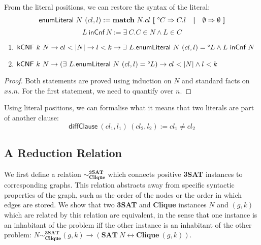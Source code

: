 \documentclass[a4paper,UKenglish,cleveref, autoref]{lipics-v2019}
\begin{document}
From the literal positions, we can restore the syntax of the literal:
\begin{align*}
  \textsf{enumLiteral}~N~(cl, l) := \textbf{match}~ N.cl ~\textbf{[}~ \degree C \Rightarrow C.l \quad\textbf{|}\quad \emptyset \Rightarrow \emptyset ~\textbf{]} 
\end{align*}
\[L~\textsf{inCnf}~N := \exists~C. C \in N \land L \in C \]
\begin{proposition}\label{prop:enumLiteralcorrect}\leavevmode
  \begin{enumerate}
    \item $\normalfont\textsf{kCNF}~k~N \rightarrow cl < |N| \rightarrow l < k \rightarrow \exists~L. \normalfont\textsf{enumLiteral}~N~(cl, l) = \degree L \land L~\textsf{inCnf}~N $
    \item $\normalfont\textsf{kCNF}~k~N \rightarrow (\exists~L. \normalfont\textsf{enumLiteral}~N~(cl, l) = \degree L) \rightarrow cl < |N| \land l < k$
  \end{enumerate}
\end{proposition}
\begin{proof}
  Both statements are proved using induction on $N$ and standard facts on $xs.n$. For the first statement, we need to quantify over $n$.
\end{proof}

Using literal positions, we can formalise what it means that two literals are part of another clause:
\[\textsf{diffClause}~(cl_1, l_1)~(cl_2, l_2) := cl_1 \neq cl_2 \]

\subsection{A Reduction Relation}
\newcommand*{\redrel}{\sim^{\textbf{3SAT}}_{\textbf{Clique}}}
We first define a relation $\redrel$ which connects positive \textbf{3SAT} instances to corresponding graphs. This relation abstracts away from specific syntactic properties of the graph, such as the order of the nodes or the order in which edges are stored. We show that two \textbf{3SAT} and \textbf{Clique} instances $N$ and $(g,k)$ which are related by this relation are equivalent, in the sense that one instance is an inhabitant of the problem iff the other instance is an inhabitant of the other problem: $N \redrel (g, k) \rightarrow (\textbf{SAT}~N \leftrightarrow \textbf{Clique}~(g, k))$.
\end{document}
